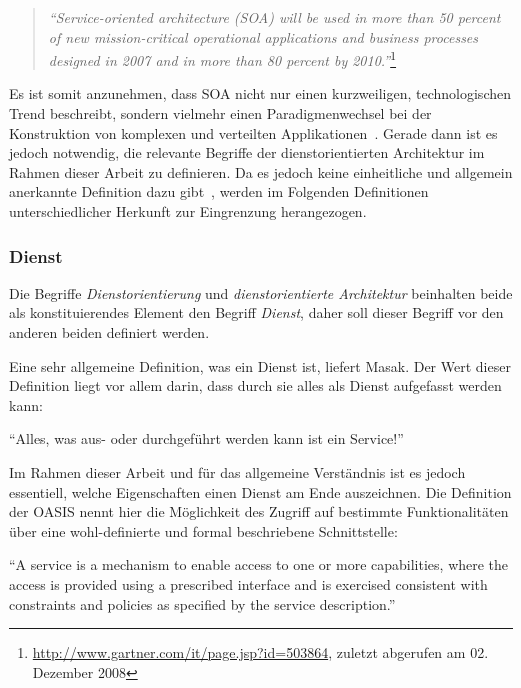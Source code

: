   \begin{quote}
    \emph{"`Service-oriented architecture (SOA) will be used in more than 50 percent of new mission-critical operational applications and business processes designed in 2007 and in more than 80 percent by 2010."'}\footnote{\url{http://www.gartner.com/it/page.jsp?id=503864}, zuletzt abgerufen am 02. Dezember 2008}
  \end{quote}
  
  Es ist somit anzunehmen, dass SOA nicht nur einen kurzweiligen, technologischen Trend beschreibt, sondern vielmehr einen Paradigmenwechsel bei der Konstruktion von komplexen und verteilten Applikationen~\citep[S. 1]{service_oriented_computing}. Gerade dann ist es jedoch notwendig, die relevante Begriffe der dienstorientierten Architektur im Rahmen dieser Arbeit zu definieren. Da es jedoch keine einheitliche und allgemein anerkannte Definition dazu gibt~\citep[S. 6]{soa_goes_real}, werden im Folgenden Definitionen unterschiedlicher Herkunft zur Eingrenzung herangezogen.
  
\subsubsection{Dienst} %
\label{ssub:definitionen_dienst}

  Die Begriffe \emph{Dienstorientierung} und \emph{dienstorientierte Architektur} beinhalten beide als konstituierendes Element den Begriff \emph{Dienst}, daher soll dieser Begriff vor den anderen beiden definiert werden.
  
  Eine sehr allgemeine Definition, was ein Dienst ist, liefert Masak. Der Wert dieser Definition liegt vor allem darin, dass durch sie alles als Dienst aufgefasst werden kann:

\begin{definition}\label{def:dienst_allgemein_}
  "`Alles, was aus- oder durchgeführt werden kann ist ein Service!"'~\emph{\citep[S. 16]{masak2007ssb}}
\end{definition}

  Im Rahmen dieser Arbeit und für das allgemeine Verständnis ist es jedoch essentiell, welche Eigenschaften einen Dienst am Ende auszeichnen. Die Definition der OASIS nennt hier die Möglichkeit des Zugriff auf bestimmte Funktionalitäten über eine wohl-definierte und formal beschriebene Schnittstelle:

\begin{definition}\label{def:dienst_oasis_}
  "`A service is a mechanism to enable access to one or more capabilities, where the access is provided using a prescribed interface and is exercised consistent with constraints and policies as specified by the service description."'~\emph{\citep[S. 12]{mackenzie2006rms}}
\end{definition}


